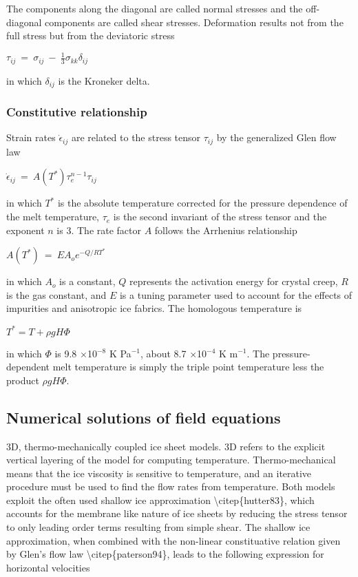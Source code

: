 The components along the diagonal are called normal stresses and the
off-diagonal components are called shear stresses. Deformation results
not from the full stress but from the deviatoric stress

$
\tau_{ ij} ~ = ~ \sigma _{ ij} ~ - ~{\frac{ 1}{ 3}} \sigma _{ kk} \delta _{ ij}
$

in which $\delta_{ ij}$ is the Kroneker delta.

\subsubsection{Constitutive relationship}

Strain rates $\dot{\epsilon}_{ij}$ are related to the stress tensor
$\tau_{ij}$ by the generalized Glen flow law

$
\dot{\epsilon}_{ij}~=~A(T^{*})\tau_{e}^{n-1}\tau_{ij}
$

in which $T^{*}$ is the absolute temperature corrected for the pressure
dependence of the melt temperature, $\tau_{e}$ is the second invariant
of the stress tensor and the exponent $n$ is 3. The rate factor $A$
follows the Arrhenius relationship

$
A\left( T^{*}\right)~=~E A_{o}e^{-Q/RT^{*}}
$

in which $A_{o}$ is a constant, $Q$ represents the activation energy for
crystal creep, $R$ is the gas constant, and $E$ is a tuning parameter
used to account for the effects of impurities and anisotropic ice
fabrics. The homologous temperature is

$
T^{*}=T+\rho g H \Phi
$

in which $\Phi$ is 9.8 $\times$10$^{-8}$ K Pa$^{-1}$, about 8.7
$\times$10$^{-4}$ K m$^{-1}$. The pressure-dependent melt temperature is
simply the triple point temperature less the product $\rho g H \Phi$.

\subsection{Numerical solutions of field equations}

3D, thermo-mechanically coupled ice sheet models. 3D refers to the
explicit vertical layering of the model for computing temperature.
Thermo-mechanical means that the ice viscosity is sensitive to
temperature, and an iterative procedure must be used to find the flow
rates from temperature. Both models exploit the often used shallow ice
approximation \textbackslash{}citep\{hutter83\}, which accounts for the
membrane like nature of ice sheets by reducing the stress tensor to only
leading order terms resulting from simple shear. The shallow ice
approximation, when combined with the non-linear constituative relation
given by Glen's flow law \textbackslash{}citep\{paterson94\}, leads to
the following expression for horizontal velocities

